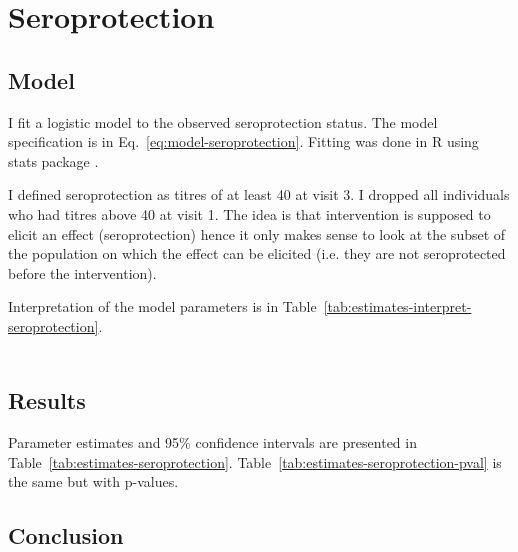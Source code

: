 \documentclass[11pt]{article}
\begin{document}
\section{Seroprotection}

\subsection{Model}

I fit a logistic model to the observed seroprotection status.
The model specification is in Eq.~\ref{eq:model-seroprotection}.
Fitting was done in R using stats package \cite{R}.

I defined seroprotection as titres of at least 40 at visit 3.
I dropped all individuals who had titres above 40 at visit 1.
The idea is that intervention is supposed to elicit an effect (seroprotection)
hence it only makes sense to look at the subset of the population on which
the effect can be elicited
(i.e. they are not seroprotected before the intervention).

Interpretation of the model parameters is in
Table~\ref{tab:estimates-interpret-seroprotection}.

\begin{equation}
    \begin{gathered}
        \label{eq:model-seroprotection}
        
    \end{gathered}
\end{equation}





\subsection{Results}

Parameter estimates and 95\% confidence intervals
are presented in Table~\ref{tab:estimates-seroprotection}.
Table~\ref{tab:estimates-seroprotection-pval} is the same but with p-values.





\subsection{Conclusion}
\end{document}

